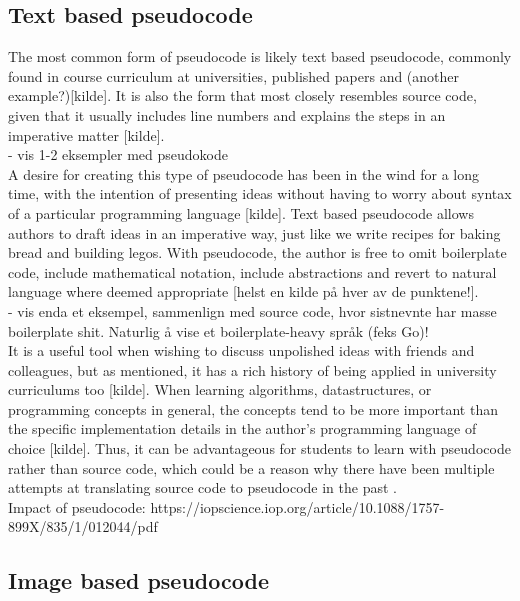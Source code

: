 \subsection{Text based pseudocode}

The most common form of pseudocode is likely text based pseudocode, commonly found in course curriculum at universities, published papers and (another example?)[kilde]. It is also the form that most closely resembles source code, given that it usually includes line numbers and explains the steps in an imperative matter [kilde]. \hfill \\

- vis 1-2 eksempler med pseudokode \\

A desire for creating this type of pseudocode has been in the wind for a long time, with the intention of presenting ideas without having to worry about syntax of a particular programming language [kilde]. Text based pseudocode allows authors to draft ideas in an imperative way, just like we write recipes for baking bread and building legos. With pseudocode, the author is free to omit boilerplate code, include mathematical notation, include abstractions and revert to natural language where deemed appropriate [helst en kilde på hver av de punktene!]. \hfill \\

- vis enda et eksempel, sammenlign med source code, hvor sistnevnte har masse boilerplate shit. Naturlig å vise et boilerplate-heavy språk (feks Go)! \\

It is a useful tool when wishing to discuss unpolished ideas with friends and colleagues, but as mentioned, it has a rich history of being applied in university curriculums too [kilde]. When learning algorithms, datastructures, or programming concepts in general, the concepts tend to be more important than the specific implementation details in the author’s programming language of choice [kilde]. Thus, it can be advantageous for students to learn with pseudocode rather than source code, which could be a reason why there have been multiple attempts at translating source code to pseudocode in the past \cite{PSEU:/Kreher/Stinson}\cite{DBLP:conf/kbse/OdaFNHSTN15}\cite{DBLP:conf/aswec/AlhefdhiDHG18}. \hfill \\

Impact of pseudocode: https://iopscience.iop.org/article/10.1088/1757-899X/835/1/012044/pdf

\subsection{Image based pseudocode}

